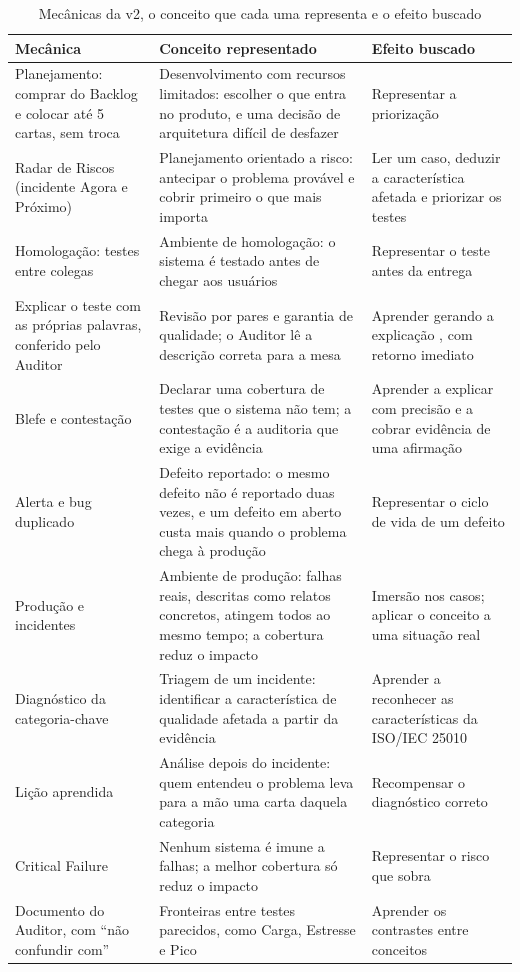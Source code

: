 \begin{table}[ht]
  \centering
  \caption{Mecânicas da v2, o conceito que cada uma representa e o efeito buscado}
  \label{tab:mecanicas}
  \footnotesize
  \begin{tabularx}{\linewidth}{>{\raggedright\arraybackslash}p{2.9cm} >{\raggedright\arraybackslash}X >{\raggedright\arraybackslash}p{4.0cm}}
    \toprule
    Mecânica & Conceito representado & Efeito buscado \\
    \midrule
    Planejamento: comprar do Backlog e colocar até 5 cartas, sem troca & Desenvolvimento com recursos limitados: escolher o que entra no produto, e uma decisão de arquitetura difícil de desfazer & Representar a priorização \\
    Radar de Riscos (incidente Agora e Próximo) & Planejamento orientado a risco: antecipar o problema provável e cobrir primeiro o que mais importa & Ler um caso, deduzir a característica afetada e priorizar os testes \\
    Homologação: testes entre colegas & Ambiente de homologação: o sistema é testado antes de chegar aos usuários \cite{humble2010} & Representar o teste antes da entrega \\
    Explicar o teste com as próprias palavras, conferido pelo Auditor & Revisão por pares e garantia de qualidade; o Auditor lê a descrição correta para a mesa & Aprender gerando a explicação \cite{slamecka1978} \cite{bertsch2007}, com retorno imediato \\
    Blefe e contestação & Declarar uma cobertura de testes que o sistema não tem; a contestação é a auditoria que exige a evidência & Aprender a explicar com precisão e a cobrar evidência de uma afirmação \\
    Alerta e bug duplicado & Defeito reportado: o mesmo defeito não é reportado duas vezes, e um defeito em aberto custa mais quando o problema chega à produção & Representar o ciclo de vida de um defeito \\
    Produção e incidentes & Ambiente de produção: falhas reais, descritas como relatos concretos, atingem todos ao mesmo tempo; a cobertura reduz o impacto & Imersão nos casos; aplicar o conceito a uma situação real \\
    Diagnóstico da categoria-chave & Triagem de um incidente: identificar a característica de qualidade afetada a partir da evidência & Aprender a reconhecer as características da ISO/IEC 25010 \\
    Lição aprendida & Análise depois do incidente: quem entendeu o problema leva para a mão uma carta daquela categoria & Recompensar o diagnóstico correto \\
    Critical Failure & Nenhum sistema é imune a falhas; a melhor cobertura só reduz o impacto & Representar o risco que sobra \\
    Documento do Auditor, com ``não confundir com'' & Fronteiras entre testes parecidos, como Carga, Estresse e Pico & Aprender os contrastes entre conceitos \\
    \bottomrule
  \end{tabularx}
\end{table}


